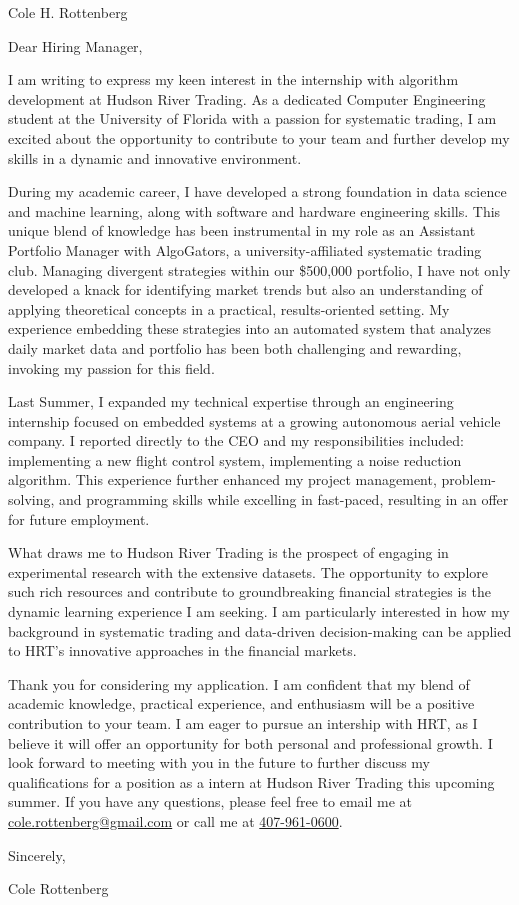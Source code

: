 \documentclass[11pt,a4paper]{article}
\begin{document}
\sloppy

\begin{center}
  \Large Cole H. Rottenberg
\end{center}


Dear Hiring Manager,
\vspace*{10pt}

I am writing to express my keen interest in the internship with algorithm development at Hudson River Trading. As a dedicated Computer Engineering student at the University of Florida with a passion for systematic trading, I am excited about the opportunity to contribute to your team and further develop my skills in a dynamic and innovative environment.

\par
During my academic career, I have developed a strong foundation in data science and machine learning, along with software and hardware engineering skills. This unique blend of knowledge has been instrumental in my role as an Assistant Portfolio Manager with AlgoGators, a university-affiliated systematic trading club. Managing divergent strategies within our \$500,000 portfolio, I have not only developed a knack for identifying market trends but also an understanding of applying theoretical concepts in a practical, results-oriented setting. My experience embedding these strategies into an automated system that analyzes daily market data and portfolio has been both challenging and rewarding, invoking my passion for this field.
\par
Last Summer, I expanded my technical expertise through an engineering internship focused on embedded systems at a growing autonomous aerial vehicle company. I reported directly to the CEO and my responsibilities included: implementing a new flight control system, implementing a noise reduction algorithm. This experience further enhanced my project management, problem-solving, and programming skills while excelling in fast-paced, resulting in an offer for future employment.
\par

What draws me to Hudson River Trading is the prospect of engaging in experimental research with the extensive datasets. The opportunity to explore such rich resources and contribute to groundbreaking financial strategies is the dynamic learning experience I am seeking. I am particularly interested in how my background in systematic trading and data-driven decision-making can be applied to HRT's innovative approaches in the financial markets.
\par
Thank you for considering my application. I am confident that my blend of academic knowledge, practical experience, and enthusiasm will be a positive contribution to your team. I am eager to pursue an intership with HRT, as I believe it will offer an opportunity for both personal and professional growth. I look forward to meeting with you in the future to further discuss my qualifications for a position as a intern at Hudson River Trading this upcoming summer. If you have any questions, please feel free to email me at \href{mailto:cole.rottenberg@gmail.com}{cole.rottenberg@gmail.com} or call me at \href{tel:+1-407-961-0600}{407-961-0600}.

Sincerely,

Cole Rottenberg
\end{document}
